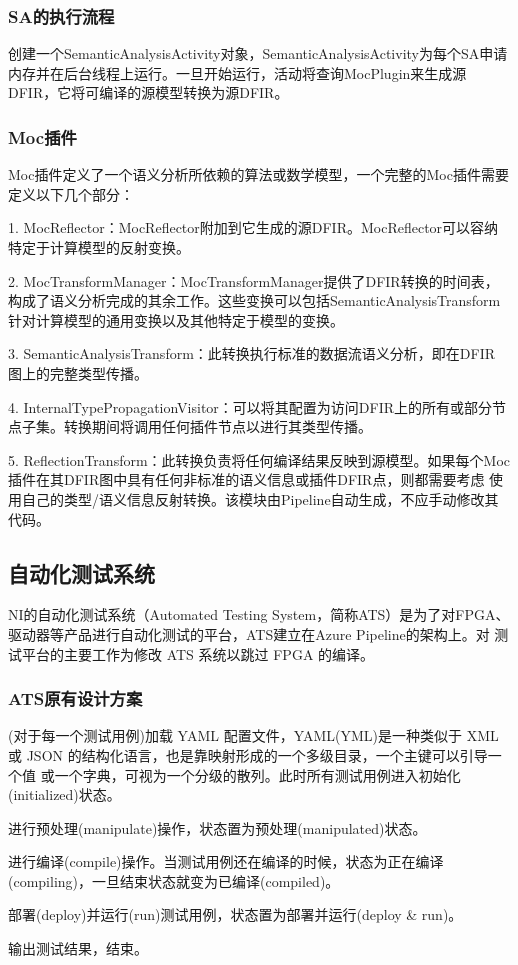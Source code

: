 \documentclass[UTF8]{ctexart}
\begin{document}
\subsubsection{SA的执行流程}
创建一个SemanticAnalysisActivity对象，SemanticAnalysisActivity为每个SA申请内存并在后台线程上运行。一旦开始运行，活动将查询MocPlugin来生成源
DFIR，它将可编译的源模型转换为源DFIR。
\par
\subsubsection{Moc插件}
Moc插件定义了一个语义分析所依赖的算法或数学模型，一个完整的Moc插件需要定义以下几个部分：
\par
1. MocReflector：MocReflector附加到它生成的源DFIR。MocReflector可以容纳特定于计算模型的反射变换。
\par
2. MocTransformManager：MocTransformManager提供了DFIR转换的时间表，构成了语义分析完成的其余工作。这些变换可以包括SemanticAnalysisTransform
针对计算模型的通用变换以及其他特定于模型的变换。
\par
3. SemanticAnalysisTransform：此转换执行标准的数据流语义分析，即在DFIR 图上的完整类型传播。
\par
4. InternalTypePropagationVisitor：可以将其配置为访问DFIR上的所有或部分节点子集。转换期间将调用任何插件节点以进行其类型传播。
\par
5. ReflectionTransform：此转换负责将任何编译结果反映到源模型。如果每个Moc插件在其DFIR图中具有任何非标准的语义信息或插件DFIR点，则都需要考虑
使用自己的类型/语义信息反射转换。该模块由Pipeline自动生成，不应手动修改其代码。
\par

\subsection{自动化测试系统}
NI的自动化测试系统（Automated Testing System，简称ATS）是为了对FPGA、驱动器等产品进行自动化测试的平台，ATS建立在Azure Pipeline的架构上。对
测试平台的主要工作为修改 ATS 系统以跳过 FPGA 的编译。
\subsubsection{ATS原有设计方案}
(对于每一个测试用例)加载 YAML 配置文件，YAML(YML)是一种类似于 XML或 JSON 的结构化语言，也是靠映射形成的一个多级目录，一个主键可以引导一个值
或一个字典，可视为一个分级的散列。此时所有测试用例进入初始化(initialized)状态。
\par
进行预处理(manipulate)操作，状态置为预处理(manipulated)状态。
\par
进行编译(compile)操作。当测试用例还在编译的时候，状态为正在编译 (compiling)，一旦结束状态就变为已编译(compiled)。
\par
部署(deploy)并运行(run)测试用例，状态置为部署并运行(deploy \& run)。
\par
输出测试结果，结束。
\end{document}
